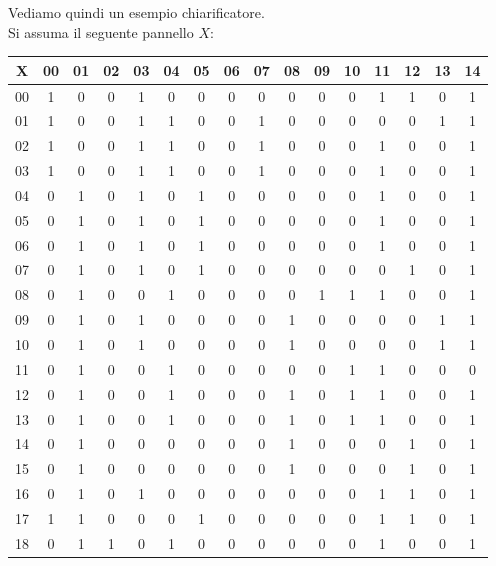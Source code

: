 \begin{esempio}
  \label{es:pbwt1}
  Vediamo quindi un esempio chiarificatore.\\
  Si assuma il seguente pannello $X$:
  \begin{table}[H]
    \centering
    \footnotesize
    \begin{tabular}{c|ccccccccccccccc}
      X & 00 & 01 & 02 & 03 & 04 & 05 & 06 & 07 & 08 & 09 & 10 & 11 & 12 & 13
      & 14 \\
      \hline
      00 & 1 & 0 & 0 & 1 & 0 & 0 & 0 & 0 & 0 & 0 & 0 & 1 & 1 & 0 & 1 \\
      01 & 1 & 0 & 0 & 1 & 1 & 0 & 0 & 1 & 0 & 0 & 0 & 0 & 0 & 1 & 1 \\
      02 & 1 & 0 & 0 & 1 & 1 & 0 & 0 & 1 & 0 & 0 & 0 & 1 & 0 & 0 & 1 \\
      03 & 1 & 0 & 0 & 1 & 1 & 0 & 0 & 1 & 0 & 0 & 0 & 1 & 0 & 0 & 1 \\
      04 & 0 & 1 & 0 & 1 & 0 & 1 & 0 & 0 & 0 & 0 & 0 & 1 & 0 & 0 & 1 \\
      05 & 0 & 1 & 0 & 1 & 0 & 1 & 0 & 0 & 0 & 0 & 0 & 1 & 0 & 0 & 1 \\
      06 & 0 & 1 & 0 & 1 & 0 & 1 & 0 & 0 & 0 & 0 & 0 & 1 & 0 & 0 & 1 \\
      07 & 0 & 1 & 0 & 1 & 0 & 1 & 0 & 0 & 0 & 0 & 0 & 0 & 1 & 0 & 1 \\
      08 & 0 & 1 & 0 & 0 & 1 & 0 & 0 & 0 & 0 & 1 & 1 & 1 & 0 & 0 & 1 \\
      09 & 0 & 1 & 0 & 1 & 0 & 0 & 0 & 0 & 1 & 0 & 0 & 0 & 0 & 1 & 1 \\
      10 & 0 & 1 & 0 & 1 & 0 & 0 & 0 & 0 & 1 & 0 & 0 & 0 & 0 & 1 & 1 \\
      11 & 0 & 1 & 0 & 0 & 1 & 0 & 0 & 0 & 0 & 0 & 1 & 1 & 0 & 0 & 0 \\
      12 & 0 & 1 & 0 & 0 & 1 & 0 & 0 & 0 & 1 & 0 & 1 & 1 & 0 & 0 & 1 \\
      13 & 0 & 1 & 0 & 0 & 1 & 0 & 0 & 0 & 1 & 0 & 1 & 1 & 0 & 0 & 1 \\
      14 & 0 & 1 & 0 & 0 & 0 & 0 & 0 & 0 & 1 & 0 & 0 & 0 & 1 & 0 & 1 \\
      15 & 0 & 1 & 0 & 0 & 0 & 0 & 0 & 0 & 1 & 0 & 0 & 0 & 1 & 0 & 1 \\
      16 & 0 & 1 & 0 & 1 & 0 & 0 & 0 & 0 & 0 & 0 & 0 & 1 & 1 & 0 & 1 \\
      17 & 1 & 1 & 0 & 0 & 0 & 1 & 0 & 0 & 0 & 0 & 0 & 1 & 1 & 0 & 1 \\
      18 & 0 & 1 & 1 & 0 & 1 & 0 & 0 & 0 & 0 & 0 & 0 & 1 & 0 & 0 & 1 \\

\end{tabular}
\end{table}
\end{esempio}
